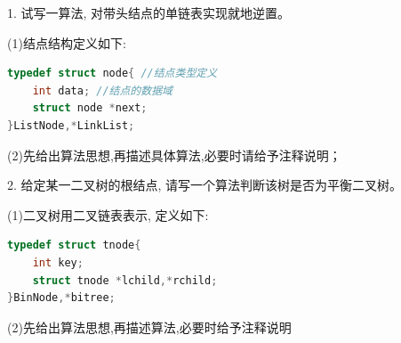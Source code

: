 1. 试写一算法, 对带头结点的单链表实现就地逆置。

(1)结点结构定义如下:
\begin{lstlisting}[language=C, basicstyle=\ttfamily]
typedef struct node{ //结点类型定义
    int data; //结点的数据域
    struct node *next;
}ListNode,*LinkList;
\end{lstlisting}

(2)先给出算法思想,再描述具体算法,必要时请给予注释说明；
\vspace{20em}

2. 给定某一二叉树的根结点, 请写一个算法判断该树是否为平衡二叉树。

(1)二叉树用二叉链表表示, 定义如下:
\begin{lstlisting}[language=C, basicstyle=\ttfamily]
typedef struct tnode{
    int key;
    struct tnode *lchild,*rchild;
}BinNode,*bitree;
\end{lstlisting}

(2)先给出算法思想,再描述算法,必要时给予注释说明
